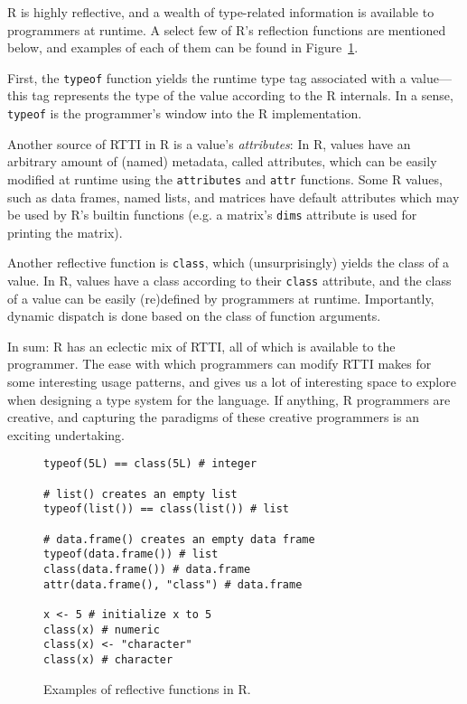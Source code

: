\documentclass[sigplan,10pt,review]{acmart}\settopmatter{printfolios=true,printccs=false,printacmref=false}
\begin{document}
R is highly reflective, and a wealth of type-related information is available to programmers at runtime.
A select few of R's reflection functions are mentioned below, and examples of each of them can be found in Figure~\ref{fig:reflectionEx}.

First, the {\tt typeof} function yields the runtime type tag associated with a value---this tag represents the type of the value according to the R internals.
In a sense, {\tt typeof} is the programmer's window into the R implementation.

Another source of RTTI in R is a value's {\it attributes}:
In R, values have an arbitrary amount of (named) metadata, called attributes, which can be easily modified at runtime using the {\tt attributes} and {\tt attr} functions.
Some R values, such as data frames, named lists, and matrices have default attributes which may be used by R's builtin functions (e.g. a matrix's {\tt dims} attribute is used for printing the matrix).

Another reflective function is {\tt class}, which (unsurprisingly) yields the class of a value.
In R, values have a class according to their {\tt class} attribute, and the class of a value can be easily (re)defined by programmers at runtime.
Importantly, dynamic dispatch is done based on the class of function arguments.

In sum: R has an eclectic mix of RTTI, all of which is available to the programmer.
The ease with which programmers can modify RTTI makes for some interesting usage patterns, and gives us a lot of interesting space to explore when designing a type system for the language.
If anything, R programmers are creative, and capturing the paradigms of these creative programmers is an exciting undertaking. 

\begin{figure}

\begin{lstlisting}
typeof(5L) == class(5L) # integer

# list() creates an empty list
typeof(list()) == class(list()) # list

# data.frame() creates an empty data frame
typeof(data.frame()) # list
class(data.frame()) # data.frame
attr(data.frame(), "class") # data.frame

x <- 5 # initialize x to 5
class(x) # numeric
class(x) <- "character"
class(x) # character

\end{lstlisting}

  \caption{Examples of reflective functions in R.}
  \label{fig:reflectionEx}
\end{figure}
\end{document}
